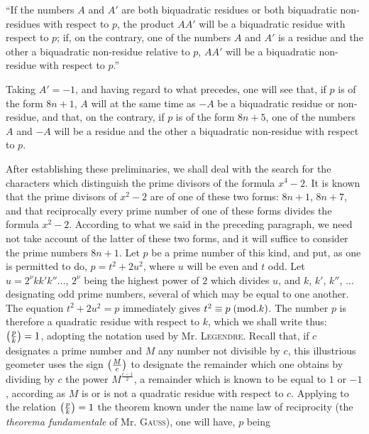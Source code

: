 \par\indent
“If the numbers $A$ and $A'$ are both biquadratic residues or both biquadratic
non-residues with respect to $p$, the product $AA'$ will be a biquadratic residue
with respect to $p$; if, on the contrary, one of the numbers $A$ and $A'$ is a
residue and the other a biquadratic non-residue relative to $p$, $AA'$ will be a
biquadratic non-residue with respect to $p$.”
\par\indent
Taking $A'=-1$, and having regard to what precedes, one will see that, if $p$
is of the form $8n+1$, $A$ will at the same time as $-A$ be a biquadratic residue
or non-residue, and that, on the contrary, if $p$ is of the form $8n+5$, one of
the numbers $A$ and $-A$ will be a residue and the other a biquadratic non-residue
with respect to $p$.
\par\indent
After establishing these preliminaries, we shall deal with the search for the
characters which distinguish the prime divisors of the formula $x^4-2$. It is
known that the prime divisors of $x^2-2$ are of one of these two forms:
$8n+1$, $8n+7$, and that reciprocally every prime number of one of these forms
divides the formula $x^2-2$. According to what we said in the preceding paragraph,
we need not take account of the latter of these two forms, and it will suffice
to consider the prime numbers $8n+1$. Let $p$ be a prime number of this kind,
and put, as one is permitted to do, $p=t^2+2u^2$, where $u$ will be even and
$t$ odd. Let $u=2^\nu kk'k''\ldots$, $2^\nu$ being the highest power of $2$ which
divides $u$, and $k$, $k'$, $k''$, $\ldots$ designating odd prime numbers, several
of which may be equal to one another. The equation $t^2+2u^2=p$ immediately
gives $t^2\equiv p\;(\mathrm{mod}.k)$. The number $p$ is therefore a quadratic residue
with respect to $k$, which we shall write thus: $\left(\frac{p}{k}\right)=1$, adopting the
notation used by Mr. \textsc{Legendre}. Recall that, if $c$ designates a prime
number and $M$ any number not divisible by $c$, this illustrious geometer uses
the sign $\left(\frac{M}{c}\right)$ to designate the remainder which one obtains by dividing
by $c$ the power $M^{\frac{c-1}{2}}$, a remainder which is known to be equal to
$1$ or $-1$, according as $M$ is or is not a quadratic residue with respect to $c$.
Applying to the relation $\left(\frac{p}{k}\right)=1$ the theorem known under the name law
of reciprocity (the \emph{theorema fundamentale} of Mr. \textsc{Gauss}), one will have, $p$ being
